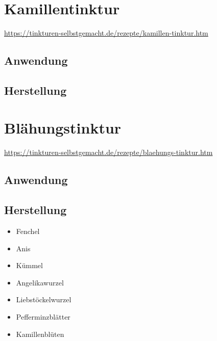 \section{Kamillentinktur}


\cite{tinkturen}

\url{https://tinkturen-selbstgemacht.de/rezepte/kamillen-tinktur.htm}

\subsection{Anwendung}
\subsection{Herstellung}




\newpage



\section{Blähungstinktur}


\cite{tinkturen}  

\url{https://tinkturen-selbstgemacht.de/rezepte/blaehungs-tinktur.htm}

\subsection{Anwendung}

\subsection{Herstellung}
\begin{itemize}
	\item Fenchel
	\item Anis
	\item Kümmel
	\item Angelikawurzel
	\item Liebstöckelwurzel
	\item Pefferminzblätter
	\item Kamillenblüten
\end{itemize}

